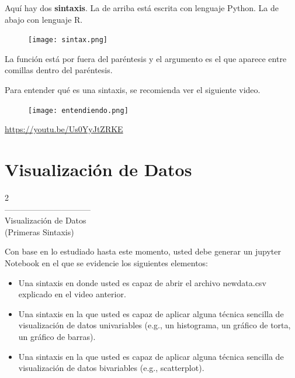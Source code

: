 \documentclass[aspectratio=169]{beamer}
\begin{document}
\begin{frame}
Aquí hay dos \textbf{sintaxis}. La de arriba está escrita con lenguaje Python. La de abajo con lenguaje R. 
\begin{figure}
\centering
\texttt{[image: sintax.png]}
\end{figure}
La función está por fuera del paréntesis y el argumento es el que aparece entre comillas dentro del paréntesis.
\end{frame}

\begin{frame}
Para entender qué es una sintaxis, se recomienda ver el siguiente video.
\begin{figure}
\texttt{[image: entendiendo.png]}
\end{figure}
\centering
\textcolor{blue}{\url{https://youtu.be/Us0YyJtZRKE}}
\end{frame}


\section{Visualización de Datos}
\begin{frame}
\begin{center}
\Huge
\textcolor{azulcesaclaro}{2\\
--------------------------------\\
Visualización de Datos \\
(Primeras Sintaxis)}
\end{center}
\end{frame}

\begin{frame}
Con base en lo estudiado hasta este momento, usted debe generar un jupyter Notebook en el que se evidencie los siguientes elementos:\\
\vspace{0.5cm}
\begin{itemize}
\item Una sintaxis en donde usted es capaz de abrir el archivo newdata.csv explicado en el video anterior.
\vspace{0.3cm}
\item Una sintaxis en la que usted es capaz de aplicar alguna técnica sencilla de visualización de datos univariables (e.g., un histograma, un gráfico de torta, un gráfico de barras).
\vspace{0.3cm}
\item Una sintaxis en la que usted es capaz de aplicar alguna técnica sencilla de visualización de datos bivariables (e.g., scatterplot).
\end{itemize}

\end{frame}
\end{document}
